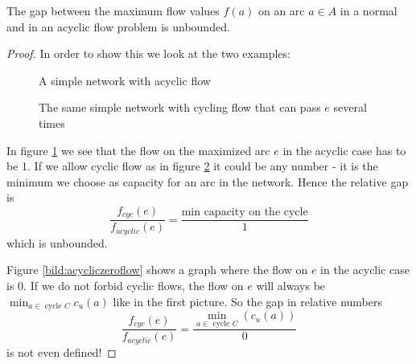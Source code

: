 \begin{prop}
 The gap between the maximum flow values $f(a)$ on an arc $a\in A$ in a normal and in an acyclic flow problem is 
unbounded. 
\end{prop}
\begin{proof}
 In order to show this we look at the two examples:
 \begin{figure}[h!]
  \centering
 \caption{A simple network with acyclic flow}
 \label{bild:acyclicTriangle}
 \end{figure}
 
 \begin{figure}[h!]
  \centering
 \caption{The same simple network with cycling flow that can pass $e$ several times}
 \label{bild:cyclicTriangle}
 \end{figure}
In figure \ref{bild:acyclicTriangle} we see that the flow on the maximized arc $e$ in the acyclic case has to be 1. 
If we allow cyclic flow as in figure \ref{bild:cyclicTriangle} it could be any number - it is the minimum we choose as 
capacity for an arc in the network. Hence the relative gap is
$$ \frac{f_{cyc}(e)}{f_{acyclic}(e)}=\frac{\textrm{min capacity on the cycle}}{1}$$ which is unbounded.


Figure \ref{bild:acycliczeroflow} shows a graph where the flow on $e$ in the acyclic case is $0$. If we do not forbid 
cyclic flows, 
the flow on $e$ will always be $\min_{a\in \textrm{ cycle }C}c_u(a)$ like in the first picture. So the gap in relative 
numbers $$ \frac{f_{cyc}(e)}{f_{acyclic}(e)}=\frac{\min_{a\in \textrm{ cycle }C}(c_u(a))}{0}$$ is not even defined!
  

\end{proof}
